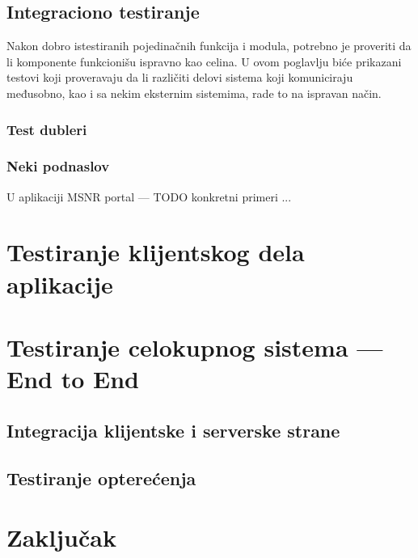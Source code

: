 \documentclass[12pt,oneside]{memoir}
\begin{document}
\section{Integraciono testiranje}
\label{sec:elixint}
\par Nakon dobro istestiranih pojedinačnih funkcija i modula, potrebno je proveriti da li komponente funkcionišu ispravno kao celina. U ovom poglavlju biće prikazani testovi koji proveravaju da li različiti delovi sistema koji komuniciraju međusobno, kao i sa nekim eksternim sistemima, rade to na ispravan način.

\subsection{Test dubleri}

\par 

\subsection{Neki podnaslov}
U aplikaciji MSNR portal --- TODO konkretni primeri ... 

\chapter{Testiranje klijentskog dela aplikacije}
\label{chp:elm}

\chapter{Testiranje celokupnog sistema --- End to End}
\label{chp:e2e}

\section{Integracija klijentske i serverske strane}

\section{Testiranje opterećenja}

\chapter{Zaključak}
\end{document}
